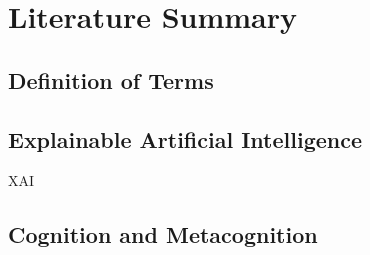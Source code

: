 \section{Literature Summary} \label{sec:literature_summary}

\subsection{Definition of Terms} \label{ssec:definition_of_terms}

\subsection{Explainable Artificial Intelligence} \label{ssec:xai}

\ac{XAI}

\parencite{Jussupow2021}

\subsection{Cognition and Metacognition} \label{ssec:cognition_and_metacognition}
